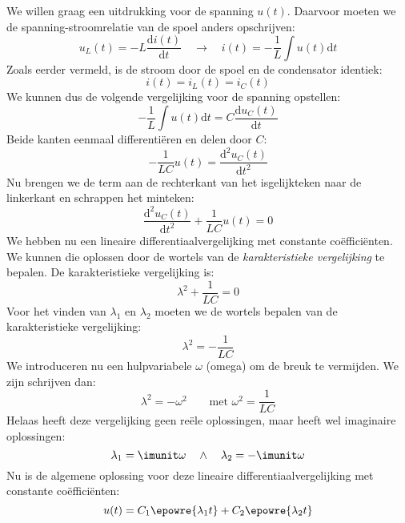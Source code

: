 We willen graag een uitdrukking voor de spanning $u(t)$. Daarvoor moeten we de spanning-stroomrelatie van de spoel anders opschrijven:
%
\begin{equation}
u_L(t) = -L\dfrac{\mathrm{d}i(t)}{\mathrm{d}t} \quad\longrightarrow\quad i(t) = -\dfrac{1}{L}\int u(t) \mathrm{d}t
\end{equation}
%
Zoals eerder vermeld, is de stroom door de spoel en de condensator identiek:
%
\begin{equation}
i(t) = i_L(t) = i_C(t)
\end{equation}
%
We kunnen dus de volgende vergelijking voor de spanning opstellen:
%
\begin{equation}
-\dfrac{1}{L}\int u(t) \mathrm{d}t = C\dfrac{\mathrm{d}u_C(t)}{\mathrm{d}t}
\end{equation}
%
Beide kanten eenmaal differentiëren en delen door $C$:
%
\begin{equation}
-\dfrac{1}{LC}u(t) =\dfrac{\mathrm{d}^2u_C(t)}{\mathrm{d}t^2}
\end{equation}
%
Nu brengen we de term aan de rechterkant van het isgelijkteken naar de linkerkant en schrappen het minteken:
%
\begin{equation}
\dfrac{\mathrm{d}^2u_C(t)}{\mathrm{d}t^2} + \dfrac{1}{LC}u(t) = 0
\end{equation}
%
We hebben nu een lineaire differentiaalvergelijking met constante coëfficiënten. We kunnen die oplossen door de wortels van de \textsl{karakteristieke vergelijking} te bepalen. De karakteristieke vergelijking is:
%
\begin{equation}
\lambda^2 + \dfrac{1}{LC}=0
\end{equation}
Voor het vinden van $\lambda_1$ en $\lambda_2$ moeten we de wortels bepalen van de karakteristieke vergelijking:
%
\begin{equation}
\lambda^2 = -\dfrac{1}{LC}
\end{equation}
%
We introduceren nu een hulpvariabele $\omega$ (omega) om de breuk te vermijden. We zijn schrijven dan:
%
\begin{equation}
\lambda^2 = -\omega^2 \qquad \text{met }\omega^2=\dfrac{1}{LC}
\end{equation}
%
Helaas heeft deze vergelijking geen reële oplossingen, maar heeft wel imaginaire oplossingen:
%
\begin{equation}
\lambda_1 = \imunit\omega \quad\wedge\quad \lambda_2 = -\imunit\omega
\end{equation}
%
Nu is de algemene oplossing voor deze lineaire differentiaalvergelijking met constante coëfficiënten:
%
\begin{equation}
u(t) = C_1\epowre{\lambda_1t} + C_2\epowre{\lambda_2t}
\end{equation}
%

